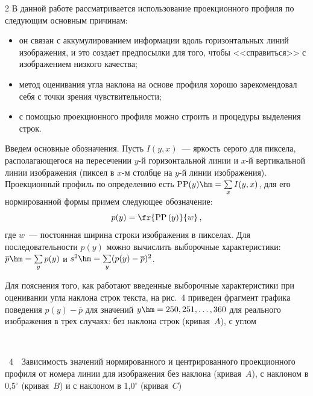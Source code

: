 \begin{multicols}{2}
      В данной работе рассматривается использование проекционного профиля по 
следующим основным причинам: 
      \begin{itemize}
\item он связан с аккумулированием информации вдоль горизонтальных линий 
изображения, и это создает предпосылки для того, чтобы <<справиться>> с 
изображением низкого качества;
\item метод оценивания угла наклона на основе профиля хорошо зарекомендовал себя 
с точки зрения чувствительности; 
\item с помощью проекционного профиля можно строить и процедуры выделения 
строк.
\end{itemize}

      Введем основные обозначения. Пусть $I(y,x)$~--- яркость серого для пиксела, 
располагающегося на пересечении $y$-й горизонтальной линии и $x$-й вертикальной 
линии изображения (пиксел в $x$-м столбце на $y$-й линии изображения). Проекционный 
профиль по определению есть $\mathrm{PP}(y)\hm=\sum\limits_x I(y,x)$, для его нормированной 
формы примем следующее обозначение: 
      $$
      p(y)=\fr{\mathrm{PP}\left(y\right)}{w}\,,
      $$
где $w$~--- постоянная ширина строки изображения в пикселах. Для последовательности 
$p(y)$ можно вычислить выборочные характеристики: $\overline{p}\hm=\sum\limits_y 
p(y)$ и $s^2\hm=\sum\limits_y (p(y)-\overline{p})^2$.
      
      Для пояснения того, как работают введенные выборочные характеристики при 
оценивании угла наклона строк текста, на рис.~4 приведен фрагмент графика поведения 
$p(y)-\overline{p}$ для значений $y\hm=250, 251, \ldots , 360$ для реального изображения 
в трех случаях: без наклона строк (кривая~$A$), с углом\linebreak\vspace*{-12pt}

\noindent
\vspace*{1pt}
\begin{center}  %
 \mbox{%
 \epsfxsize=67.136mm
 }
 \end{center}
{{\figurename~4}\ \ \small{Зависимость значений нормированного и центрированного проекционного профиля от 
номера линии для изображения без наклона (кривая~$A$), с наклоном в 0,5$^\circ$ (кривая~$B$) и 
с наклоном в 1,0$^\circ$ (кривая~$C$)}}





\end{multicols}
